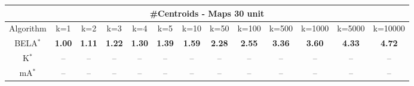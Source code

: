 \begin{tabular}{c|cccccccccccc}\toprule
\multicolumn{13}{c}{#Centroids - Maps 30 unit}\\ \midrule
Algorithm & k=1 & k=2 & k=3 & k=4 & k=5 & k=10 & k=50 & k=100 & k=500 & k=1000 & k=5000 & k=10000 \\ \midrule
BELA$^*$ & \textbf{1.00} & \textbf{1.11} & \textbf{1.22} & \textbf{1.30} & \textbf{1.39} & \textbf{1.59} & \textbf{2.28} & \textbf{2.55} & \textbf{3.36} & \textbf{3.60} & \textbf{4.33} & \textbf{4.72} \\
K$^*$ & -- & -- & -- & -- & -- & -- & -- & -- & -- & -- & -- & -- \\
mA$^*$ & -- & -- & -- & -- & -- & -- & -- & -- & -- & -- & -- & -- \\ \bottomrule 
\end{tabular}

